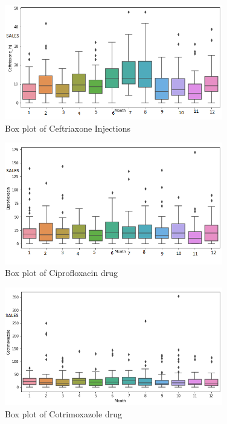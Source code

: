 \documentclass[12pt]{report}
\begin{document}
\begin{figure}[H]%
  \begin {center}
  \includegraphics[width=0.85\textwidth]{images/downloadC.png}
  \caption{Box plot of Ceftriaxone Injections}
  \label{fig:ecg}
  \end {center}
\end{figure}


\begin{figure}[H]%
  \begin {center}
  \includegraphics[width=0.85\textwidth]{images/downloadD.png}
  \caption{Box plot of Ciprofloxacin drug}
  \label{fig:ecg}
  \end {center}
\end{figure}

\begin{figure}[H]%
  \begin {center}
  \includegraphics[width=0.85\textwidth]{images/downloadE.png}
  \caption{Box plot of Cotrimoxazole drug}
  \label{fig:ecg}
  \end {center}
\end{figure}
\end{document}
